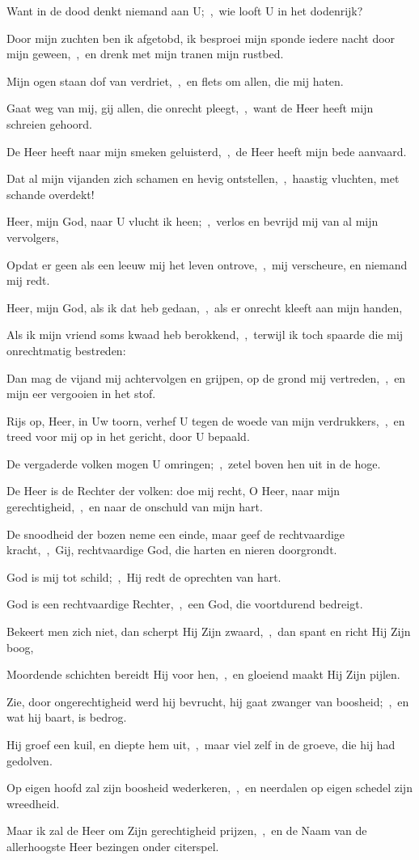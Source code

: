\documentclass[12pt,twoside,a5paper]{article}
\begin{document}
\begin{halfparskip}
  Want in de dood denkt niemand aan U;~\sep\ wie looft U in het dodenrijk?

  Door mijn zuchten ben ik afgetobd, ik besproei mijn sponde iedere nacht door mijn geween,~\sep\ en drenk met mijn tranen mijn rustbed.

  Mijn ogen staan dof van verdriet,~\sep\ en flets om allen, die mij haten.

  Gaat weg van mij, gij allen, die onrecht pleegt,~\sep\ want de Heer heeft mijn schreien gehoord.

  De Heer heeft naar mijn smeken geluisterd,~\sep\ de Heer heeft mijn bede aanvaard.

  Dat al mijn vijanden zich schamen en hevig ontstellen,~\sep\ haastig vluchten, met schande overdekt!

   Heer, mijn God, naar U vlucht ik heen;~\sep\ verlos en bevrijd mij van al mijn vervolgers,

  Opdat er geen als een leeuw mij het leven ontrove,~\sep\ mij verscheure, en niemand mij redt.

  Heer, mijn God, als ik dat heb gedaan,~\sep\ als er onrecht kleeft aan mijn handen,

  Als ik mijn vriend soms kwaad heb berokkend,~\sep\ terwijl ik toch spaarde die mij onrechtmatig bestreden:

  Dan mag de vijand mij achtervolgen en grijpen, op de grond mij vertreden,~\sep\ en mijn eer vergooien in het stof.

  Rijs op, Heer, in Uw toorn, verhef U tegen de woede van mijn verdrukkers,~\sep\ en treed voor mij op in het gericht, door U bepaald.

  De vergaderde volken mogen U omringen;~\sep\ zetel boven hen uit in de hoge.

  De Heer is de Rechter der volken: doe mij recht, O Heer, naar mijn gerechtigheid,~\sep\ en naar de onschuld van mijn hart.

  De snoodheid der bozen neme een einde, maar geef de rechtvaardige kracht,~\sep\ Gij, rechtvaardige God, die harten en nieren doorgrondt.

  God is mij tot schild;~\sep\ Hij redt de oprechten van hart.

  God is een rechtvaardige Rechter,~\sep\ een God, die voortdurend bedreigt.

  Bekeert men zich niet, dan scherpt Hij Zijn zwaard,~\sep\ dan spant en richt Hij Zijn boog,

  Moordende schichten bereidt Hij voor hen,~\sep\ en gloeiend maakt Hij Zijn pijlen.

  Zie, door ongerechtigheid werd hij bevrucht, hij gaat zwanger van boosheid;~\sep\ en wat hij baart, is bedrog.

  Hij groef een kuil, en diepte hem uit,~\sep\ maar viel zelf in de groeve, die hij had gedolven.

  Op eigen hoofd zal zijn boosheid wederkeren,~\sep\ en neerdalen op eigen schedel zijn wreedheid.

  Maar ik zal de Heer om Zijn gerechtigheid prijzen,~\sep\ en de Naam van de allerhoogste Heer bezingen onder citerspel.
\end{halfparskip}
\end{document}
